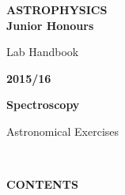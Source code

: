\documentclass[12pt]{article}
\begin{document}
\pagestyle{empty}
\centering
\vspace*{2cm}

{\Huge\bf ASTROPHYSICS \\ Junior Honours
\vspace*{3mm}

 Lab Handbook}
\vspace*{1cm}

{\Huge\bf 2015/16}
\vspace*{1cm}

\vspace*{3cm}

{\huge\bf Spectroscopy

Astronomical Exercises


}

~
\newpage

\centering
{\Large\bf CONTENTS}
\vspace*{2cm}

\raggedright
\end{document}
